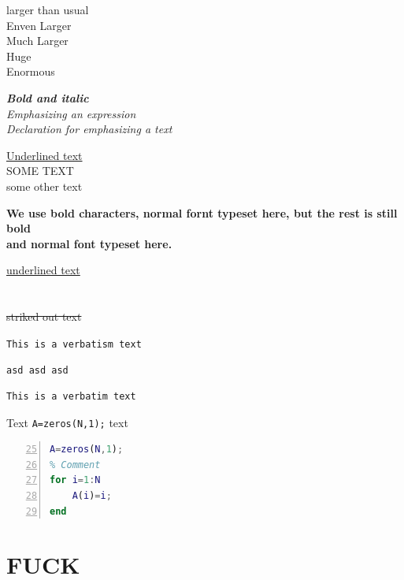 \documentclass{article}
\begin{document}
    {\large larger than usual}\\
    {\Large Enven Larger}\\
    {\LARGE Much Larger}\\
    {\huge Huge}\\
    {\Huge Enormous}

    \textbf{\textit{Bold and italic}}\\
    \emph{Emphasizing an expression}\\
    {\em Declaration for emphasizing a text}

    \underline{Underlined text}\\
    \MakeUppercase{some text}\\
    \MakeLowercase{some other text}

    \bfseries We use bold characters,
    \textnormal{normal fornt typeset here,} but the rest is still bold \\
    \normalfont and normal font typeset here.

    \uline{underlined text}\\
    \\
    \\
    \sout{striked out text}\\

    \verb!This is a verbatism text!

    \verb*|asd asd asd|

    \begin{verbatim}
This is a verbatim text
    \end{verbatim}

Text \lstinline!A=zeros(N,1);! text

    \begin{lstlisting}[language=Matlab,numbers=left,firstnumber=25]
A=zeros(N,1);
% Comment
for i=1:N
    A(i)=i;
end
    \end{lstlisting}

    \section{FUCK}
\end{document}
